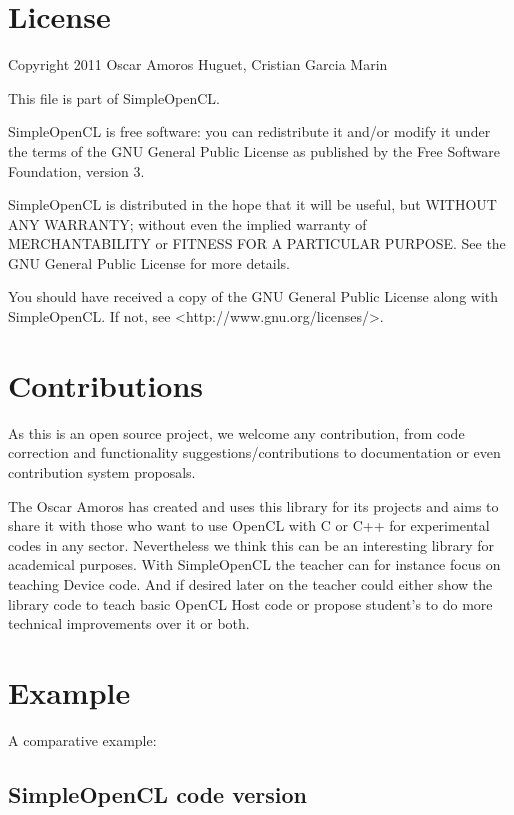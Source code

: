 \documentclass{report}
\begin{document}
\section{License}
Copyright 2011 Oscar Amoros Huguet, Cristian Garcia Marin

This file is part of SimpleOpenCL.

SimpleOpenCL is free software: you can redistribute it and/or modify
it under the terms of the GNU General Public License as published by
the Free Software Foundation, version 3.

SimpleOpenCL is distributed in the hope that it will be useful,
but WITHOUT ANY WARRANTY; without even the implied warranty of
MERCHANTABILITY or FITNESS FOR A PARTICULAR PURPOSE. See the
GNU General Public License for more details.

You should have received a copy of the GNU General Public License
along with SimpleOpenCL.  If not, see <http://www.gnu.org/licenses/>.


\section{Contributions}
As this is an open source project, we welcome any contribution, from code correction and functionality suggestions/contributions to documentation or even contribution system proposals.

The Oscar Amoros has created and uses this library for its projects and aims to share it with those who want to use OpenCL with C or C++ for experimental codes in any sector. Nevertheless we think this can be an interesting library for academical purposes. With SimpleOpenCL the teacher can for instance focus on teaching Device code. And if desired later on the teacher could either show the library code to teach basic OpenCL Host code or propose student's to do more technical improvements over it or both.

\section{Example}
A comparative example:

\subsection{SimpleOpenCL code version}
\end{document}
